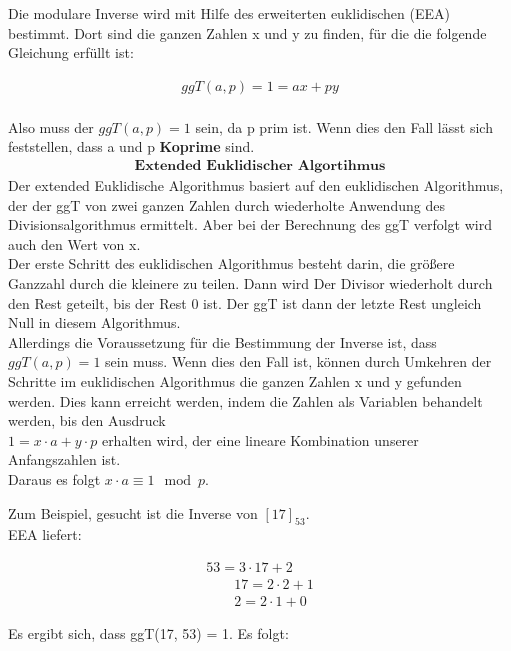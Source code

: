 Die modulare Inverse wird mit Hilfe des erweiterten euklidischen (EEA) bestimmt.
Dort sind die ganzen Zahlen x und y zu finden, für die die folgende Gleichung erfüllt ist: 
\begin{ceqn}
 \begin{align*}
      ggT (a, p) = 1 = ax + py  \\
 \end{align*}
\end{ceqn}

Also muss der $ ggT (a, p) = 1 $ sein, da p prim ist. Wenn dies den Fall lässt sich feststellen, dass a und p \textbf{Koprime} sind.
\begin{align*}
    \textbf{Extended Euklidischer Algortihmus}
\end{align*}
Der extended Euklidische Algorithmus basiert auf den euklidischen Algorithmus, der der ggT von zwei ganzen Zahlen durch wiederholte Anwendung des Divisionsalgorithmus ermittelt. Aber bei der Berechnung des ggT verfolgt wird auch den Wert von x. \\

Der erste Schritt des euklidischen Algorithmus besteht darin, die größere Ganzzahl durch die kleinere zu teilen. Dann wird Der Divisor wiederholt durch den Rest geteilt, bis der Rest 0 ist. Der ggT ist dann der letzte Rest ungleich Null in diesem Algorithmus. \\
Allerdings die Voraussetzung für die Bestimmung der Inverse ist, dass $ ggT(a, p) = 1 $ sein muss. 
Wenn dies den Fall ist, können durch Umkehren der Schritte im euklidischen Algorithmus die ganzen Zahlen x und y gefunden werden.
Dies kann erreicht werden, indem die Zahlen als Variablen behandelt werden, bis den Ausdruck \\
\(1 = x \cdot a + y \cdot p \) erhalten wird, der eine lineare Kombination unserer Anfangszahlen ist. \\
Daraus es folgt \( x \cdot a \equiv 1 \mod p \). 

Zum Beispiel, gesucht ist die Inverse von $[17]_{53}$. \\
EEA liefert:
\begin{ceqn}
\begin{align*}
              53 = 3 \cdot 17 + 2 \\
    \qquad    17 = 2 \cdot 2 + \boxed{1}   \\
    \qquad    2 = 2 \cdot 1 + 0
\end{align*}
\end{ceqn}
Es ergibt sich, dass ggT(17, 53) = 1. Es folgt: \\ 

